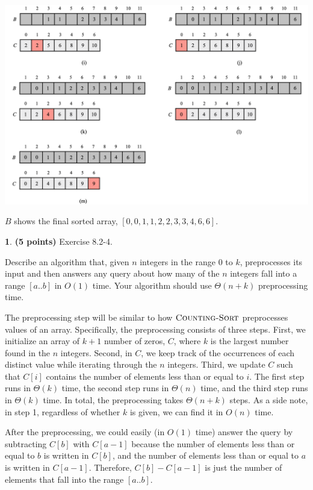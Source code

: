 \documentclass[11pt]{article}
\theoremstyle{definition}
\theoremstyle{theorem}
\newtheorem{prob}{}
\newcommand{\solution}{\medskip\noindent{\color{DarkBlue}\textbf{Solution:}}}
\begin{document}
\includegraphics[scale=0.6]{hw3q3-3.png}

$B$ shows the final sorted array, $[0, 0, 1, 1, 2, 2, 3, 3, 4, 6, 6]$.


\newpage
\begin{prob} \textbf{(5 points)} Exercise 8.2-4.
\end{prob}

Describe an algorithm that, given $n$ integers in the range $0$ to $k$, preprocesses its input and then answers any query about how many of the $n$ integers fall into a range $[a..b]$ in $O(1)$ time. Your algorithm should use $\Theta{(n+k)}$ preprocessing time.

\solution

The preprocessing step will be similar to how $\textproc{\textsc{Counting-Sort}}$ preprocesses values of an array. Specifically, the preprocessing consists of three steps. First, we initialize an array of $k+1$ number of zeros, $C$, where $k$ is the largest number found in the $n$ integers. Second, in $C$, we keep track of the occurrences of each distinct value while iterating through the $n$ integers. Third, we update $C$ such that $C[i]$ contains the number of elements less than or equal to $i$. The first step runs in $\Theta{(k)}$ time, the second step runs in $\Theta{(n)}$ time, and the third step runs in $\Theta{(k)}$ time. In total, the preprocessing takes $\Theta{(n+k)}$ steps. As a side note, in step 1, regardless of whether $k$ is given, we can find it in $O{(n)}$ time.

After the preprocessing, we could easily (in $O(1)$ time) answer the query by subtracting $C[b]$ with $C[a-1]$ because the number of elements less than or equal to $b$ is written in $C[b]$, and the number of elements less than or equal to $a$ is written in $C[a-1]$. Therefore, $C[b] - C[a-1]$ is just the number of elements that fall into the range $[a..b]$.
\end{document}
